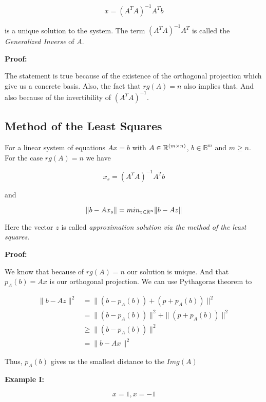 \[
	x = {(A^T A)}^{-1} A^T b
\]

is a unique solution to the system. The term \({(A^T A)}^{-1}A^T\) is called the 
\emph{Generalized Inverse} of \(A\).
\vspace{\baselineskip}

\textbf{Proof:}

The statement is true because of the existence of the orthogonal projection which give us a concrete basis. Also, 
the fact that \(rg(A) = n\) also implies that. And also because of the invertibility of \({(A^T A)}^{-1}\).

\QED

\subsection{Method of the Least Squares}

For a linear system of equations \(Ax=b\) with \(A \in \mathbb{R}^{(m \times n)}\), 
\(b \in \mathbb{B}^m\) and \(m \ge n\). For the case \(rg(A) = n\) we have

\[
	x_s = {(A^T A)}^{-1} A^T b
\]

and 

\[
	\| b - Ax_s \| = min_{z \in \mathbb{R}^n} \| b - Az \| 
\]

Here the vector \(z\) is called \emph{approximation solution via the method of the least squares}.
\vspace{\baselineskip}

\textbf{Proof:}

We know that because of \(rg(A) = n\) our solution is unique. And that \(p_A(b) = Ax\) is our orthogonal 
projection. We can use Pythagoras theorem to


\begin{align*}
	\| b - Az \|^2 &= \| (b  - p_A (b))  + (p + p_A(b)) \|^2 \\
				&=  \| (b  - p_A (b))\|^2  +\|(p + p_A(b)) \|^2 \\
				&\ge  \| (b  - p_A (b))\|^2 \\
				&= \| b - Ax \|^2 
\end{align*}

Thus, \(p_A(b)\) gives us the smallest distance to the \(Img(A)\)

\QED
\vspace{\baselineskip}

\textbf{Example I:}
\vspace{\baselineskip}

\[
	x = 1, x = -1
\]

